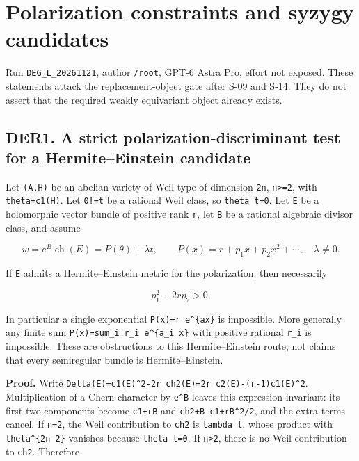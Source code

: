\documentclass[11pt,a4paper]{article}
\theoremstyle{definition}
\begin{document}
\section{Polarization constraints and syzygy candidates}

Run \texttt{DEG\_L\_20261121}, author \texttt{/root}, GPT-6 Astra Pro,
effort not exposed. These statements attack the replacement-object gate
after S-09 and S-14. They do not assert that the required weakly
equivariant object already exists.

\subsection{DER1. A strict polarization-discriminant test for a
Hermite--Einstein
candidate}\label{derived-candidates-der1.-a-strict-polarization-discriminant-test-for-a-hermiteeinstein-candidate}

Let \texttt{(A,H)} be an abelian variety of Weil type of dimension
\texttt{2n}, \texttt{n\textgreater{}=2}, with \texttt{theta=c1(H)}. Let
\texttt{0!=t} be a rational Weil class, so \texttt{theta\ t=0}. Let
\texttt{E} be a holomorphic vector bundle of positive rank \texttt{r},
let \texttt{B} be a rational algebraic divisor class, and assume

\[
 w=e^B\operatorname{ch}(E)=P(\theta)+\lambda t,\qquad
 P(x)=r+p_1x+p_2x^2+\cdots,\quad \lambda\ne0.
\]

If \texttt{E} admits a Hermite--Einstein metric for the polarization,
then necessarily

\[
 p_1^2-2rp_2>0.
\tag{DER1}
\]

In particular a single exponential \texttt{P(x)=r\ e\^{}\{ax\}} is
impossible. More generally any finite sum
\texttt{P(x)=sum\_i\ r\_i\ e\^{}\{a\_i\ x\}} with positive rational
\texttt{r\_i} is impossible. These are obstructions to this
Hermite--Einstein route, not claims that every semiregular bundle is
Hermite--Einstein.

\textbf{Proof.} Write
\texttt{Delta(E)=c1(E)\^{}2-2r\ ch2(E)=2r\ c2(E)-(r-1)c1(E)\^{}2}.
Multiplication of a Chern character by \texttt{e\^{}B} leaves this
expression invariant: its first two components become \texttt{c1+rB} and
\texttt{ch2+B\ c1+rB\^{}2/2}, and the extra terms cancel. If
\texttt{n=2}, the Weil contribution to \texttt{ch2} is
\texttt{lambda\ t}, whose product with \texttt{theta\^{}\{2n-2\}}
vanishes because \texttt{theta\ t=0}. If \texttt{n\textgreater{}2},
there is no Weil contribution to \texttt{ch2}. Therefore
\end{document}
